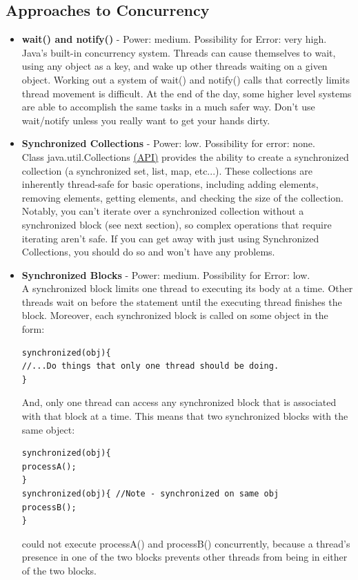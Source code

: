\documentclass[11pt]{article}
\begin{document}
\subsection{Approaches to Concurrency}
\begin{itemize}
\item \textbf{wait() and notify()} - Power: medium. Possibility for Error: very high.\\
Java's built-in concurrency system. Threads can cause themselves to wait, using any object as a key, and wake up other threads waiting on a given object. Working out a system of wait() and notify() calls that correctly limits thread movement is difficult. At the end of the day, some higher level systems are able to accomplish the same tasks in a much safer way. Don't use wait/notify unless you really want to get your hands dirty.
\item \textbf{Synchronized Collections} - Power: low. Possibility for error: none. \\
Class java.util.Collections \href{http://docs.oracle.com/javase/7/docs/api/java/util/Collections.html\#synchronizedCollection(java.util.Collection)}{({\color{blue}\underline{API}})} provides the ability to create a synchronized collection (a synchronized set, list, map, etc...). These collections are inherently thread-safe for basic operations, including adding elements, removing elements, getting elements, and checking the size of the collection. Notably, you can't iterate over a synchronized collection without a synchronized block (see next section), so complex operations that require iterating aren't safe. If you can get away with just using Synchronized Collections, you should do so and won't have any problems.
\item \textbf{Synchronized Blocks} - Power: medium. Possibility for Error: low.\\
A synchronized block limits one thread to executing its body at a time. Other threads wait on before the statement until the executing thread finishes the block. Moreover, each synchronized block is called on some object in the form:
\begin{lstlisting}[frame=single]
synchronized(obj){
//...Do things that only one thread should be doing.
}
\end{lstlisting}
And, only one thread can access any synchronized block that is associated with that block at a time. This means that two synchronized blocks with the same object:
\begin{lstlisting}[frame=single]
synchronized(obj){
processA();
}
synchronized(obj){ //Note - synchronized on same obj
processB();
}
\end{lstlisting}
could not execute processA() and processB()  concurrently, because a thread's presence in one of the two blocks prevents other threads from being in either of the two blocks.\\


\end{itemize}
\end{document}
